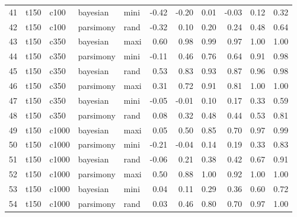\documentclass[12pt,letterpaper]{article}
\begin{document}
\begin{longtable}{rllllrrrrrr}
  41 & t150 & c100 & bayesian & mini & -0.42 & -0.20 & 0.01 & -0.03 & 0.12 & 0.32 \\ 
  42 & t150 & c100 & parsimony & rand & -0.32 & 0.10 & 0.20 & 0.24 & 0.48 & 0.64 \\ 
  43 & t150 & c350 & bayesian & maxi & 0.60 & 0.98 & 0.99 & 0.97 & 1.00 & 1.00 \\ 
  44 & t150 & c350 & parsimony & mini & -0.11 & 0.46 & 0.76 & 0.64 & 0.91 & 0.98 \\ 
  45 & t150 & c350 & bayesian & rand & 0.53 & 0.83 & 0.93 & 0.87 & 0.96 & 0.98 \\ 
  46 & t150 & c350 & parsimony & maxi & 0.31 & 0.72 & 0.91 & 0.81 & 1.00 & 1.00 \\ 
  47 & t150 & c350 & bayesian & mini & -0.05 & -0.01 & 0.10 & 0.17 & 0.33 & 0.59 \\ 
  48 & t150 & c350 & parsimony & rand & 0.08 & 0.32 & 0.48 & 0.44 & 0.53 & 0.81 \\ 
  49 & t150 & c1000 & bayesian & maxi & 0.05 & 0.50 & 0.85 & 0.70 & 0.97 & 0.99 \\ 
  50 & t150 & c1000 & parsimony & mini & -0.21 & -0.04 & 0.14 & 0.19 & 0.33 & 0.83 \\ 
  51 & t150 & c1000 & bayesian & rand & -0.06 & 0.21 & 0.38 & 0.42 & 0.67 & 0.91 \\ 
  52 & t150 & c1000 & parsimony & maxi & 0.50 & 0.88 & 1.00 & 0.92 & 1.00 & 1.00 \\ 
  53 & t150 & c1000 & bayesian & mini & 0.04 & 0.11 & 0.29 & 0.36 & 0.60 & 0.72 \\ 
  54 & t150 & c1000 & parsimony & rand & 0.03 & 0.46 & 0.80 & 0.70 & 0.97 & 1.00 \\ 
   \hline
\end{longtable}
\end{document}
